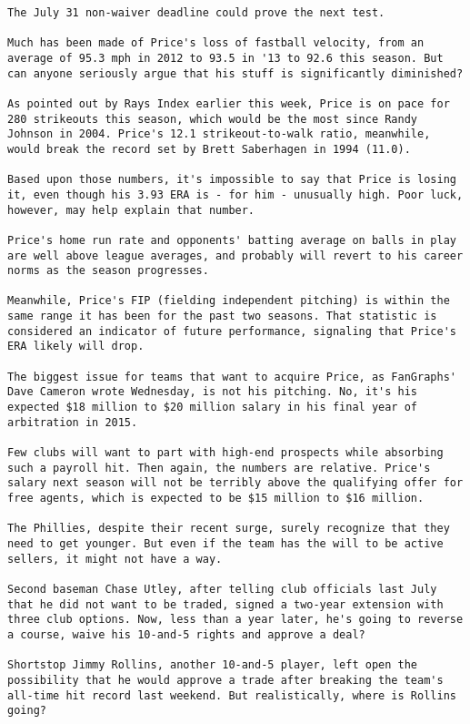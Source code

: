 \begin{lstlisting}
The July 31 non-waiver deadline could prove the next test.

Much has been made of Price's loss of fastball velocity, from an average of 95.3 mph in 2012 to 93.5 in '13 to 92.6 this season. But can anyone seriously argue that his stuff is significantly diminished?

As pointed out by Rays Index earlier this week, Price is on pace for 280 strikeouts this season, which would be the most since Randy Johnson in 2004. Price's 12.1 strikeout-to-walk ratio, meanwhile, would break the record set by Brett Saberhagen in 1994 (11.0).

Based upon those numbers, it's impossible to say that Price is losing it, even though his 3.93 ERA is - for him - unusually high. Poor luck, however, may help explain that number.

Price's home run rate and opponents' batting average on balls in play are well above league averages, and probably will revert to his career norms as the season progresses.

Meanwhile, Price's FIP (fielding independent pitching) is within the same range it has been for the past two seasons. That statistic is considered an indicator of future performance, signaling that Price's ERA likely will drop.

The biggest issue for teams that want to acquire Price, as FanGraphs' Dave Cameron wrote Wednesday, is not his pitching. No, it's his expected $18 million to $20 million salary in his final year of arbitration in 2015.

Few clubs will want to part with high-end prospects while absorbing such a payroll hit. Then again, the numbers are relative. Price's salary next season will not be terribly above the qualifying offer for free agents, which is expected to be $15 million to $16 million.

The Phillies, despite their recent surge, surely recognize that they need to get younger. But even if the team has the will to be active sellers, it might not have a way.

Second baseman Chase Utley, after telling club officials last July that he did not want to be traded, signed a two-year extension with three club options. Now, less than a year later, he's going to reverse a course, waive his 10-and-5 rights and approve a deal?

Shortstop Jimmy Rollins, another 10-and-5 player, left open the possibility that he would approve a trade after breaking the team's all-time hit record last weekend. But realistically, where is Rollins going?


\end{lstlisting}
